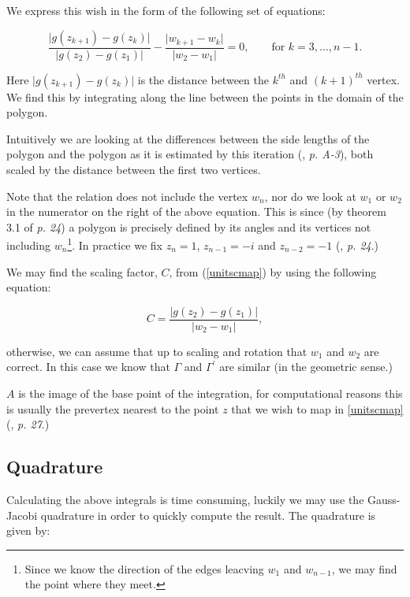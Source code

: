 \documentclass[a4paper,10pt]{amsart}
\begin{document}
We express this wish in the form of the following set of equations:

\begin{equation}
\label{optimizeme}
\frac{\vert g(z_{k+1}) -  g(z_k) \vert}{\vert g(z_2)-g(z_1)\vert} - \frac{\vert w_{k+1} - w_k\vert}{\vert w_2 - w_1\vert} = 0, \qquad \text{for } k=3,\dots,n-1.
\end{equation}

Here $\vert g(z_{k+1}) -  g(z_k) \vert$ is the distance between the $k^{th}$ and $(k+1)^{th}$ vertex.  We find this by integrating along the line between the points in the domain of the polygon.

Intuitively we are looking at the differences between the side lengths of the polygon and the polygon as it is estimated by this iteration (\cite{snider}, \emph{p. A-3}), both scaled by the distance between the first two vertices.

Note that the relation does not include the vertex $w_n$, nor do we look at $w_1$ or $w_2$ in the numerator on the right of the above equation. This is since (by theorem 3.1 of \cite{driscoll} \emph{p. 24}) a polygon is precisely defined by its angles and its vertices not including $w_n$\footnote{Since we know the direction of the edges leacving $w_1$ and $w_{n-1}$, we may find the point where they meet.}. In practice we fix $z_n=1$, $z_{n-1}=-i$ and $z_{n-2}=-1$ (\cite{driscoll}, \emph{p. 24}.)

We may find the scaling factor, $C$, from (\ref{unitscmap}) by using the following equation:

\begin{equation}
C=\frac{\vert g(z_2)-g(z_1)\vert}{\vert w_2 - w_1\vert},
\end{equation}

otherwise, we can assume that up to scaling and rotation that $w_1$ and $w_2$ are correct. In this case we know that $\Gamma$ and $\Gamma^\prime$ are similar (in the geometric sense.) 

$A$ is the image of the base point of the integration, for computational reasons this is usually the prevertex nearest to the point $z$ that we wish to map in \ref{unitscmap}  (\cite{driscoll}, \emph{p. 27}.)


\subsection{Quadrature}

Calculating the above integrals is time consuming, luckily we may use the Gauss-Jacobi quadrature in order to quickly compute the result. The quadrature is given by:
\end{document}
